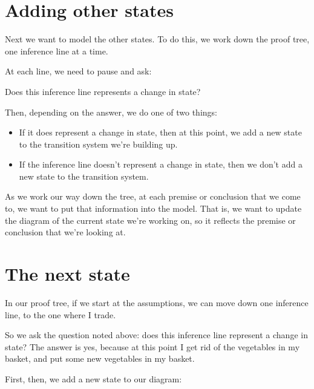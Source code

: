 \documentclass[../../../main.tex]{subfiles}
\begin{document}
\section{Adding other states}

Next we want to model the other states. To do this, we work down the proof tree, one inference line at a time. 

At each line, we need to pause and ask:

\begin{center}
  Does this inference line represents a change in state?
\end{center}

\noindent
Then, depending on the answer, we do one of two things:

\begin{itemize}
  \item{If it does represent a change in state, then at this point, we add a new state to the transition system we're building up.}
  \item{If the inference line doesn't represent a change in state, then we don't add a new state to the transition system.}
\end{itemize}

\noindent
As we work our way down the tree, at each premise or conclusion that we come to, we want to put that information into the model. That is, we want to update the diagram of the current state we're working on, so it reflects the premise or conclusion that we're looking at.


\section{The next state}

In our proof tree, if we start at the assumptions, we can move down one inference line, to the one where I trade. 

So we ask the question noted above: does this inference line represent a change in state? The answer is yes, because at this point I get rid of the vegetables in my basket, and put some new vegetables in my basket.

First, then, we add a new state to our diagram:
\end{document}

